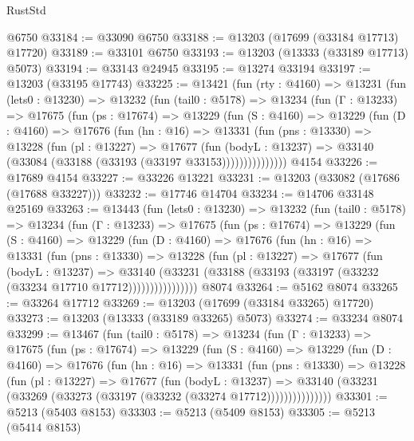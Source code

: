 \begin{lexlean}{RustStd}
\begin{coremodule}
    @6750
@33184 := @33090 @6750
@33188 := @13203 (@17699 (@33184 @17713) @17720)
@33189 := @33101 @6750
@33193 := @13203 (@13333 (@33189 @17713) @5073)
@33194 := @33143 @24945
@33195 := @13274 @33194
@33197 := @13203 (@33195 @17743)
@33225 := @13421
    (fun (rty : @4160) =>
    @13231
      (fun (lets0 : @13230) =>
      @13232
        (fun (tail0 : @5178) =>
        @13234
          (fun (Γ : @13233) =>
          @17675
            (fun (ps : @17674) =>
            @13229
              (fun (S : @4160) =>
              @13229
                (fun (D : @4160) =>
                @17676
                  (fun (hn : @16) =>
                  @13331
                    (fun (pns : @13330) =>
                    @13228
                      (fun (pl : @13227) =>
                      @17677
                        (fun (bodyL : @13237) =>
                        @33140 (@33084 (@33188 (@33193 (@33197 @33153)))))))))))))))
    @4154
@33226 := @17689 @4154
@33227 := @33226 @13221
@33231 := @13203 (@33082 (@17686 (@17688 @33227)))
@33232 := @17746 @14704
@33234 := @14706 @33148 @25169
@33263 := @13443
    (fun (lets0 : @13230) =>
    @13232
      (fun (tail0 : @5178) =>
      @13234
        (fun (Γ : @13233) =>
        @17675
          (fun (ps : @17674) =>
          @13229
            (fun (S : @4160) =>
            @13229
              (fun (D : @4160) =>
              @17676
                (fun (hn : @16) =>
                @13331
                  (fun (pns : @13330) =>
                  @13228
                    (fun (pl : @13227) =>
                    @17677
                      (fun (bodyL : @13237) =>
                      @33140
                        (@33231
                          (@33188 (@33193 (@33197 (@33232 (@33234 @17710 @17712))))))))))))))))
    @8074
@33264 := @5162 @8074
@33265 := @33264 @17712
@33269 := @13203 (@17699 (@33184 @33265) @17720)
@33273 := @13203 (@13333 (@33189 @33265) @5073)
@33274 := @33234 @8074
@33299 := @13467
    (fun (tail0 : @5178) =>
    @13234
      (fun (Γ : @13233) =>
      @17675
        (fun (ps : @17674) =>
        @13229
          (fun (S : @4160) =>
          @13229
            (fun (D : @4160) =>
            @17676
              (fun (hn : @16) =>
              @13331
                (fun (pns : @13330) =>
                @13228
                  (fun (pl : @13227) =>
                  @17677
                    (fun (bodyL : @13237) =>
                    @33140 (@33231 (@33269 (@33273 (@33197 (@33232 (@33274 @17712)))))))))))))))
@33301 := @5213 (@5403 @8153)
@33303 := @5213 (@5409 @8153)
@33305 := @5213 (@5414 @8153)

\end{coremodule}
\end{lexlean}
